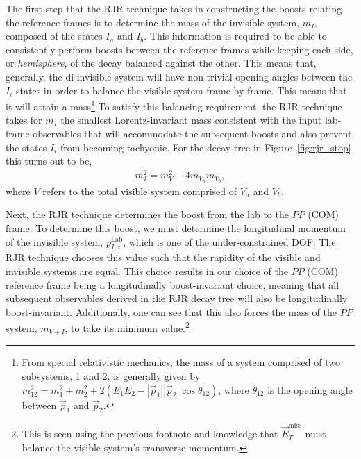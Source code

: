 The first step that the RJR technique takes in constructing the boosts relating the reference frames is to
determine the mass of the invisible system, $m_I$, composed of the states $I_a$ and $I_b$.
This information is required to be able to consistently perform boosts between the reference frames while
keeping each side, or \textit{hemisphere}, of the decay balanced against the other.
This means that, generally, the di-invisible system will have non-trivial opening angles between the $I_i$
states in order to balance the visible system frame-by-frame.
This means that it will attain a mass\footnote{From special relativistic mechanics, the mass of a system comprised
of two subsystems, 1 and 2, is generally given by $m_{12}^2 = m_1^2 + m_2^2 + 2(E_1E_2 - |\vec{p}_1| |\vec{p}_2| \cos \theta_{12})$,
where $\theta_{12}$ is the opening angle between $\vec{p}_1$ and $\vec{p}_2$.}
To satisfy this balancing requirement, the RJR technique takes for $m_I$ the smallest Lorentz-invariant
mass consistent with the input lab-frame observables that will accommodate the subsequent boosts and also prevent
the states $I_i$ from becoming tachyonic.
For the decay tree in Figure~\ref{fig:rjr_stop} this turns out to be,
\begin{align}
    m_I^2 = m_V^2 - 4m_{V_a} m_{V_b},
    \label{eq:rjr_invisible_mass}
\end{align}
where $V$ refers to the total visible system comprised of $V_a$ and $V_b$.

Next, the RJR technique determines the boost from the lab to the $PP$ (COM) frame.
To determine this boost, we must determine the longitudinal momentum of the invisible system, $p_{I,z}^{\text{Lab}}$,
which is one of the under-constrained DOF.
The RJR technique chooses this value such that the rapidity of the visible and invisible systems are equal.
This choice results in our choice of the $PP$ (COM) reference frame being a longitudinally boost-invariant
choice, meaning that all subsequent observables derived in the RJR decay tree will also be
longitudinally boost-invariant.
Additionally, one can see that this also forces the mass of the $PP$ system, $m_{V+I}$, to
take its minimum value.\footnote{This is seen using the previous footnote and knowledge that $\vec{E}_T^{\text{miss}}$
must balance the visible system's transverse momentum.}


